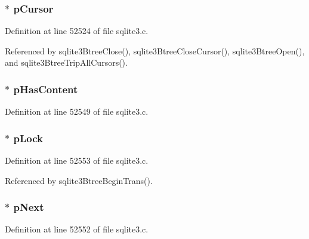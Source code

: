 \subsubsection[{p\+Cursor}]{$\ast$ p\+Cursor}\label{struct_bt_shared_a3719d9ea75c17cb66e4f628b8a4bd106}


Definition at line 52524 of file sqlite3.\+c.



Referenced by sqlite3\+Btree\+Close(), sqlite3\+Btree\+Close\+Cursor(), sqlite3\+Btree\+Open(), and sqlite3\+Btree\+Trip\+All\+Cursors().

\hypertarget{struct_bt_shared_a7c495df66ccfb0ad05cca7513fbbb930}{}
\subsubsection[{p\+Has\+Content}]{$\ast$ p\+Has\+Content}\label{struct_bt_shared_a7c495df66ccfb0ad05cca7513fbbb930}


Definition at line 52549 of file sqlite3.\+c.

\hypertarget{struct_bt_shared_a403bf6a43c2fd8ed0607553518004c91}{}
\subsubsection[{p\+Lock}]{$\ast$ p\+Lock}\label{struct_bt_shared_a403bf6a43c2fd8ed0607553518004c91}


Definition at line 52553 of file sqlite3.\+c.



Referenced by sqlite3\+Btree\+Begin\+Trans().

\hypertarget{struct_bt_shared_a546c1c14e62f140cc3503f3aa893d971}{}
\subsubsection[{p\+Next}]{$\ast$ p\+Next}\label{struct_bt_shared_a546c1c14e62f140cc3503f3aa893d971}


Definition at line 52552 of file sqlite3.\+c.



